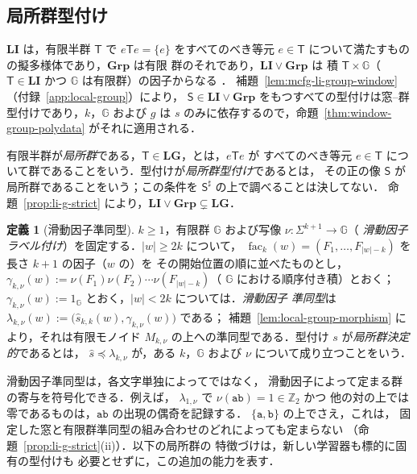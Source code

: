 \documentclass[11pt,a4paper]{ltjsarticle}
\numberwithin{equation}{section}
\theoremstyle{plain}
\theoremstyle{definition}
\newtheorem{definition}[theorem]{定義}
\theoremstyle{remark}
\theoremstyle{plain}
\begin{document}
\subsection{局所群型付け}
\label{subsec:algebraic-typed-data}

$\mathbf{LI}$ は，有限半群 $\mathsf T$ で
$e\mathsf Te=\{e\}$ をすべてのべき等元 $e\in \mathsf T$ について満たすものの擬多様体であり，$\mathbf{Grp}$ は有限
群のそれであり，$\mathbf{LI}\vee\mathbf{Grp}$ は
積 $\mathsf T\times {\mathbb G}$（$\mathsf T\in\mathbf{LI}$ かつ ${\mathbb G}$ は有限群）の因子からなる \cite{Costa2002LI,Costa2002LIG}．
補題~\ref{lem:mcfg-li-group-window}（付録~\ref{app:local-group}）により，
$\mathsf S\in\mathbf{LI}\vee\mathbf{Grp}$ をもつすべての型付けは窓--群型付けであり，$k$，${\mathbb G}$
および $g$ は $s$ のみに依存するので，命題~\ref{thm:window-group-polydata} がそれに適用される．

有限半群が\emph{局所群}である，$\mathsf T\in\mathbf{LG}$，とは，$e\mathsf Te$ が
すべてのべき等元 $e\in\mathsf T$ について群であることをいう．型付けが\emph{局所群型付け}であるとは，
その正の像 $\mathsf S$ が局所群であることをいう；この条件を
$\mathsf S^\sharp$ の上で調べることは決してない．
命題~\ref{prop:li-g-strict} により，$\mathbf{LI}\vee\mathbf{Grp}\subsetneq\mathbf{LG}$．

\begin{definition}[滑動因子準同型]
\label{def:local-group-typing}
$k\ge1$，有限群 ${\mathbb G}$ および写像 $\nu:\Sigma^{k+1}\to {\mathbb G}$（
\emph{滑動因子ラベル付け}）を固定する．$|w|\ge2k$ について，
$\operatorname{fac}_k(w)=(F_1,\ldots,F_{|w|-k})$ を長さ $k+1$ の因子（$w$ の）を
その開始位置の順に並べたものとし，
$\gamma_{k,\nu}(w):=\nu(F_1)\nu(F_2)\cdots\nu(F_{|w|-k})$（
${\mathbb G}$ における順序付き積）とおく；$\gamma_{k,\nu}(w):=1_{\mathbb G}$ とおく，$|w|<2k$ については．\emph{滑動因子
準同型}は $\lambda_{k,\nu}(w):=\bigl(\widehat s_{k,k}(w),\gamma_{k,\nu}(w)\bigr)$ である；
補題~\ref{lem:local-group-morphism} により，それは有限モノイド
$M_{k,\nu}$ の上への準同型である．型付け $s$ が\emph{局所群決定的}であるとは，
$\widehat s\preceq\lambda_{k,\nu}$ が，ある $k$，${\mathbb G}$ および $\nu$ について成り立つことをいう．
\end{definition}

滑動因子準同型は，各文字単独によってではなく，
滑動因子によって定まる群の寄与を符号化できる．例えば，
$\lambda_{1,\nu}$ で $\nu(\mathtt{ab})=1\in\mathbb Z_2$ かつ
他の対の上では零であるものは，$\mathtt{ab}$ の出現の偶奇を記録する．
$\{\mathtt a,\mathtt b\}$ の上でさえ，これは，
固定した窓と有限群準同型の組み合わせのどれによっても定まらない
（命題~\ref{prop:li-g-strict}(ii)）．以下の局所群の
特徴づけは，新しい学習器も標的に固有の型付けも
必要とせずに，この追加の能力を表す．
\end{document}
